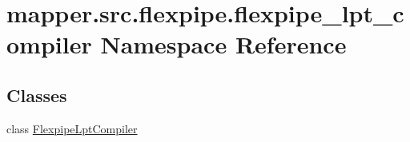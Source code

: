 \hypertarget{namespacemapper_1_1src_1_1flexpipe_1_1flexpipe__lpt__compiler}{}\section{mapper.\+src.\+flexpipe.\+flexpipe\+\_\+lpt\+\_\+compiler Namespace Reference}
\label{namespacemapper_1_1src_1_1flexpipe_1_1flexpipe__lpt__compiler}
\subsection*{Classes}
\begin{DoxyCompactItemize}
\item 
class \hyperlink{classmapper_1_1src_1_1flexpipe_1_1flexpipe__lpt__compiler_1_1_flexpipe_lpt_compiler}{Flexpipe\+Lpt\+Compiler}
\end{DoxyCompactItemize}
